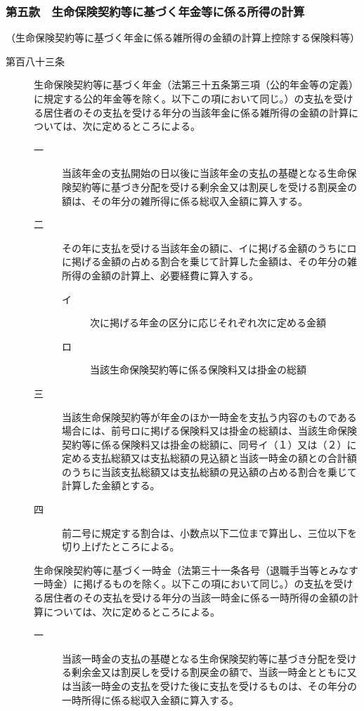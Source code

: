 \documentclass[twocolumn,a4j,10pt]{ltjtarticle}
\begin{document}
\subsubsection*{第五款　生命保険契約等に基づく年金等に係る所得の計算}
\noindent\hspace{10pt}（生命保険契約等に基づく年金に係る雑所得の金額の計算上控除する保険料等）
\begin{description}
\item[第百八十三条]生命保険契約等に基づく年金（法第三十五条第三項（公的年金等の定義）に規定する公的年金等を除く。以下この項において同じ。）の支払を受ける居住者のその支払を受ける年分の当該年金に係る雑所得の金額の計算については、次に定めるところによる。
\begin{description}
\item[一]当該年金の支払開始の日以後に当該年金の支払の基礎となる生命保険契約等に基づき分配を受ける剰余金又は割戻しを受ける割戻金の額は、その年分の雑所得に係る総収入金額に算入する。
\item[二]その年に支払を受ける当該年金の額に、イに掲げる金額のうちにロに掲げる金額の占める割合を乗じて計算した金額は、その年分の雑所得の金額の計算上、必要経費に算入する。
\begin{description}
\item[イ]次に掲げる年金の区分に応じそれぞれ次に定める金額
\item[ロ]当該生命保険契約等に係る保険料又は掛金の総額
\end{description}
\item[三]当該生命保険契約等が年金のほか一時金を支払う内容のものである場合には、前号ロに掲げる保険料又は掛金の総額は、当該生命保険契約等に係る保険料又は掛金の総額に、同号イ（１）又は（２）に定める支払総額又は支払総額の見込額と当該一時金の額との合計額のうちに当該支払総額又は支払総額の見込額の占める割合を乗じて計算した金額とする。
\item[四]前二号に規定する割合は、小数点以下二位まで算出し、三位以下を切り上げたところによる。
\end{description}
\item[]生命保険契約等に基づく一時金（法第三十一条各号（退職手当等とみなす一時金）に掲げるものを除く。以下この項において同じ。）の支払を受ける居住者のその支払を受ける年分の当該一時金に係る一時所得の金額の計算については、次に定めるところによる。
\begin{description}
\item[一]当該一時金の支払の基礎となる生命保険契約等に基づき分配を受ける剰余金又は割戻しを受ける割戻金の額で、当該一時金とともに又は当該一時金の支払を受けた後に支払を受けるものは、その年分の一時所得に係る総収入金額に算入する。

\end{description}
\end{description}
\end{document}
